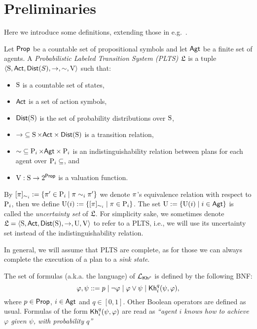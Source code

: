 \section{Preliminaries}
\label{sec:preliminaries}

Here we introduce some definitions, extending those in e.g.~\cite{AFSVQ21}.

\begin{definition}\label{def:plts}
    Let $\PROP$ be a countable set of propositional symbols and let $\AGT$ be a finite set of agents.  
    A \emph{Probabilistic Labeled Transition System (PLTS)} $\model$ is a tuple
    $\tup{\S,\ACT,\dist(S),\ra,\sim,\V}$ such that:
    \begin{itemize}
        \item $\S$ is a countable set of states,
        \item $\ACT$ is a set of action symbols,
        \item $\dist(\S)$ is the set of probability distributions over $\S$,
        \item ${\ra} \subseteq \S \times \ACT \times \dist(\S)$ is a transition relation,
        \item ${\sim}\subseteq \DS{i} \times \AGT \times \DS{i}$ is an indistinguishability relation between plans for each agent over $\DS{i}\subseteq$, and
        \item $\V: \S \ra 2^\PROP$ is a valuation function.
    \end{itemize}
    By $[\plan]_{\sim_i}:=\set{\plan' \in \DS{i} \mid \plan \sim_i \plan'}$ we denote $\plan$'s equivalence relation with respect to $\DS{i}$, then we define $\Unc(i) := \set{[\plan]_{\sim_i} \mid \plan\in\DS{i}}$. The set $\Unc:=\set{\Unc(i) \mid i\in\AGT}$ is called the \emph{uncertainty set} of $\model$. For simplicity sake, we sometimes denote $\model=\tup{\S,\ACT,\dist(\S),\ra,\Unc,\V}$ to refer to a PLTS, i.e., we will use its uncertainty set instead of the indistinguishability relation.
\end{definition}

In general, we will assume that PLTS are complete, as for those we can always complete the execution of a plan to a \emph{sink state}.

\begin{definition}
    \label{def:syntax}
    The set of formulas (a.k.a. the language) of $\PKh$ is defined by the following BNF:
    \[
        \varphi, \psi ::= p \mid \neg \varphi \mid \varphi \vee \psi \mid \kh_i^q(\psi,\varphi),
    \]
    where $p\in\PROP$, $i\in\AGT$ and $q\in[0,1]$. Other Boolean operators are defined as usual. Formulas of the form $\kh_i^q(\psi,\varphi)$ are read as \emph{``agent $i$ knows how to achieve $\varphi$ given $\psi$, with probability $q$''}
\end{definition}


